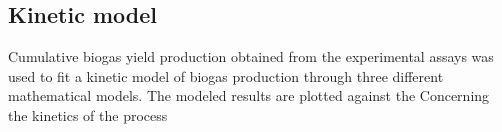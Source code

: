 \subsection{Kinetic model}
Cumulative biogas yield production obtained from the experimental assays was used to fit a kinetic model of biogas production through three different mathematical models. The  modeled results are plotted against the
Concerning the kinetics of the process